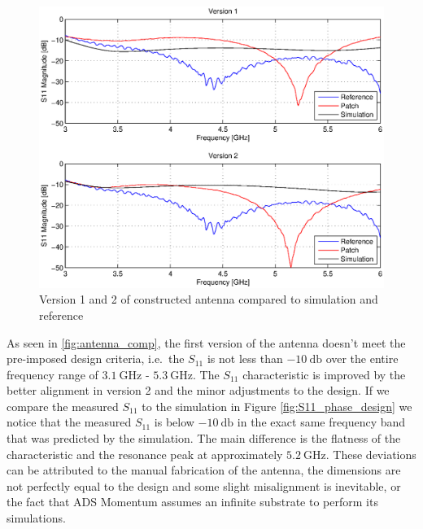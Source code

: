\documentclass[a4paper]{article}        %
\begin{document}
		\begin{figure}[H]
			\centering
			\includegraphics[width=\textwidth]{images/antenna/antenna_comparison.eps}
			\caption{Version 1 and 2 of constructed antenna compared to simulation and reference}
			\label{fig:antenna_comp}
		\end{figure}

		As seen in \autoref{fig:antenna_comp}, the first version of the antenna doesn't meet the pre-imposed design criteria, i.e.\ the $S_{11}$ is not less than $\SI{-10}{\decibel}$ over the entire frequency range of $\SI{3.1}{\giga\hertz}$ - $\SI{5.3}{\giga\hertz}$.
		The $S_{11}$ characteristic is improved by the better alignment in version 2 and the minor adjustments to the design.
		If we compare the measured $S_{11}$ to the simulation in Figure \ref{fig:S11_phase_design} we notice that the measured $S_{11}$ is below $\SI{-10}{\decibel}$ in the exact same frequency band that was predicted by the simulation. The main difference is the flatness of the characteristic and the resonance peak at approximately $\SI{5.2}{\giga\hertz}$. These deviations can be attributed to the manual fabrication of the antenna, the dimensions are not perfectly equal to the design and some slight misalignment is inevitable, or the fact that ADS Momentum assumes an infinite substrate to perform its simulations.\\\\
		
\end{document}
